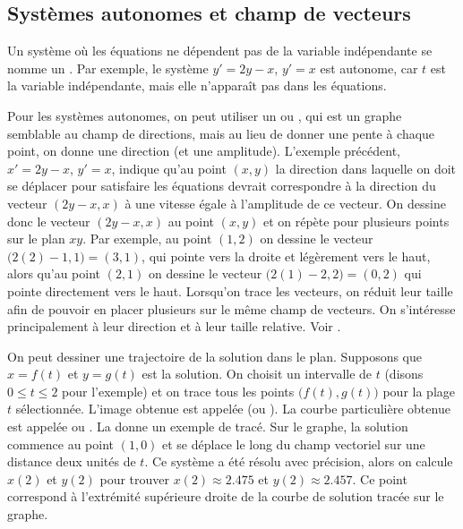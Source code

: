 \subsection{Systèmes autonomes et champ de vecteurs}

Un système où les équations ne dépendent pas de la variable indépendante se nomme un  \emph{}.  Par exemple, le système $y'=2y-x$, $y'=x$ est autonome, car $t$ est la variable indépendante, mais elle n’apparaît pas dans les équations.

Pour les systèmes autonomes, on peut utiliser un
\emph{} ou \emph{},
qui est un graphe semblable au champ de directions, mais au lieu de donner une pente à chaque point, on donne une direction (et une amplitude). L’exemple précédent, $x' = 2y-x$, $y' = x$, indique qu’au point $(x,y)$ la direction dans laquelle on doit se déplacer pour satisfaire les équations devrait correspondre à la direction du vecteur $( 2y-x, x )$
à une vitesse égale à l'amplitude de ce vecteur. On dessine donc le vecteur $(2y-x,x)$ au point $(x,y)$ et on répète pour plusieurs points sur le plan $xy$.
Par exemple, au point $(1,2)$ on dessine le vecteur
$\bigl(2(2)-1,1\bigr) = (3,1)$,
qui pointe vers la droite et légèrement vers le haut, alors qu’au point $(2,1)$ on dessine le vecteur $\bigl(2(1)-2,2\bigr) = (0,2)$
qui pointe directement vers le haut.
Lorsqu’on trace les vecteurs, on réduit leur taille afin de pouvoir en placer plusieurs sur le même champ de vecteurs. On s’intéresse principalement à leur direction et à leur taille relative.  Voir
.

On peut dessiner une trajectoire de la solution dans le plan. Supposons que $x = f(t)$ et $y=g(t)$ est la solution.  On choisit un intervalle de $t$ (disons $0 \leq t \leq 2$ pour l’exemple) et on trace tous les points
$\bigl(f(t),g(t)\bigr)$ pour la plage $t$ sélectionnée. L’image obtenue est appelée \emph{}
(ou ).
La courbe particulière obtenue est appelée \emph{} ou \emph{}.
La  donne un exemple de tracé.
Sur le graphe, la solution commence au point $(1,0)$ et se déplace le long du champ vectoriel sur une distance deux unités de $t$.  Ce système a été résolu avec précision, alors on calcule $x(2)$ et $y(2)$ pour trouver
$x(2) \approx 2.475$ et $y(2) \approx 2.457$.  Ce point correspond à l’extrémité supérieure droite de la courbe de solution tracée sur le graphe.

